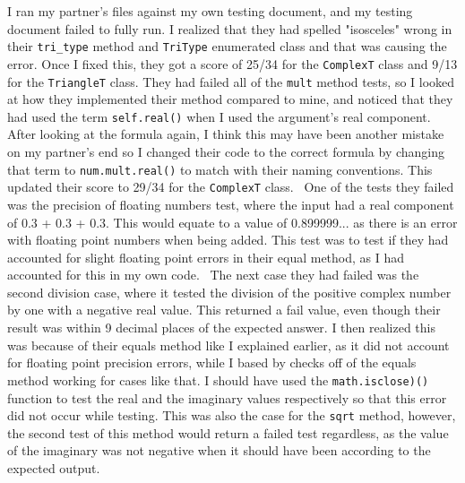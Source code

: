 \documentclass[12pt]{article}
\begin{document}
I ran my partner's files against my own testing document, and my testing document 
failed to fully run. I realized that they had spelled "isosceles" wrong in their 
\verb|tri_type| method and \verb|TriType| enumerated class and that was causing 
the error. Once I fixed this, they got a score of 25/34 for the \verb|ComplexT| 
class and 9/13 for the \verb|TriangleT| class. They had failed all of the 
\verb|mult| method tests, so I looked at how they implemented their method 
compared to mine, and noticed that they had used the term \verb|self.real()| 
when I used the argument's real component. After looking at the formula again, 
I think this may have been another mistake on my partner's end so I changed their 
code to the correct formula by changing that term to \verb|num.mult.real()| to 
match with their naming conventions. This updated their score to 29/34 for the 
\verb|ComplexT| class. 
~\newline\noindent One of the tests they failed was the precision of floating 
numbers test, where the input had a real component of 0.3 + 0.3 + 0.3. This would 
equate to a value of 0.899999... as there is an error with floating point numbers 
when being added. This test was to test if they had accounted for slight floating 
point errors in their equal method, as I had accounted for this in my own code. 
~\newline\noindent The next case they had failed was the second division case, 
where it tested the division of the positive complex number by one with a negative 
real value. This returned a fail value, even though their result was within 9 
decimal places of the expected answer. I then realized this was because of their 
equals method like I explained earlier, as it did not account for floating point 
precision errors, while I based by checks off of the equals method working for 
cases like that. I should have used the \verb|math.isclose)()| function to test 
the real and the imaginary values respectively so that this error did not occur 
while testing. This was also the case for the \verb|sqrt| method, however, the 
second test of this method would return a failed test regardless, as the value 
of the imaginary was not negative when it should have been according to the 
expected output. 
\end{document}
